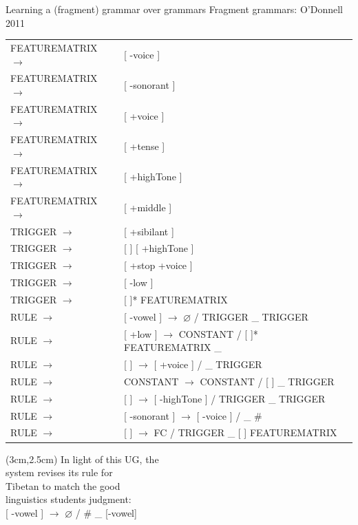 \documentclass{beamer}
\begin{document}
\begin{frame}{Learning a (fragment) grammar over grammars}
  Fragment grammars: O'Donnell 2011
  \small
  \begin{tabular}{ll}
    FEATUREMATRIX $\to$& [ -voice ]\\
     FEATUREMATRIX $\to$& [ -sonorant ]\\
 FEATUREMATRIX $\to$& [ +voice ]\\
 FEATUREMATRIX $\to$& [ +tense ]\\
 FEATUREMATRIX $\to$& [ +highTone ]\\
 FEATUREMATRIX $\to$& [ +middle ]\\
 TRIGGER $\to$& [ +sibilant ]\\
 TRIGGER $\to$& [ ] [ +highTone ]\\
 TRIGGER $\to$& [ +stop +voice ]\\
 TRIGGER $\to$& [ -low ]\\
 TRIGGER $\to$& [ ]* FEATUREMATRIX\\
 RULE $\to$& {\color{red}[ -vowel ] $\to$ $\varnothing$ / TRIGGER \_ TRIGGER}\\
 RULE $\to$& [ +low ] $\to$ CONSTANT / [ ]* FEATUREMATRIX \_\\
 RULE $\to$& [ ] $\to$ [ +voice ] / \_ TRIGGER\\
 RULE $\to$& CONSTANT $\to$ CONSTANT / [ ] \_ TRIGGER\\
 RULE $\to$& [ ] $\to$ [ -highTone ] / TRIGGER \_ TRIGGER\\
 RULE $\to$& {\color{red}[ -sonorant ] $\to$ [ -voice ] / \_ \#}\\
 RULE $\to$& [ ] $\to$ FC / TRIGGER \_ [ ] FEATUREMATRIX\\
  \end{tabular}

    \begin{textblock*}{6cm}(3cm,2.5cm)
         \hspace{0.7cm}  \large    In light of this UG, the \\
         \hspace{0.7cm}system revises its rule for \\
         \hspace{0.7cm}Tibetan to match the good \\
         \hspace{0.7cm}linguistics students judgment:\\
{\color{red}\hspace{0.3}[ -vowel ] $\to$ $\varnothing$ / } \# \_ [-vowel]
    \end{textblock*}
\end{frame}
\end{document}
